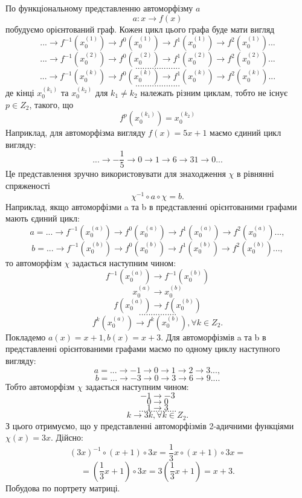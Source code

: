 \documentclass[a4paper,12pt]{article} \usepackage{a4wide}
\numberwithin{equation}{subsection}
\begin{document}
По функціональному представленню автоморфізму $a$ $$a:x\rightarrow f(x)$$
побудуємо орієнтований граф. Кожен цикл цього графа буде мати вигляд
$$...\rightarrow f^{-1}(x^{(1)}_0)\rightarrow f^0(x^{(1)}_0)\rightarrow f^1(x^{(1)}_0)\rightarrow f^2(x^{(1)}_0)...$$
$$...\rightarrow f^{-1}(x^{(2)}_0)\rightarrow f^0(x^{(2)}_0)\rightarrow f^1(x^{(2)}_0)\rightarrow f^2(x^{(2)}_0)...$$
$$...................$$
 $$...\rightarrow f^{-1}(x^{(k)}_0)\rightarrow f^0(x^{(k)}_0)\rightarrow f^1(x^{(k)}_0)\rightarrow f^2(x^{(k)}_0)...$$
 $$...................$$
  де кінці $x^{(k_1)}_0$ та $x^{(k_2)}_0$ для $k_1\neq k_2$ належать різним циклам,
   тобто не існує $p\in Z_2$, такого, що $$f^p(x^{(k_1)}_0)=x^{(k_2)}_0$$
   Наприклад, для автоморфізма вигляду $f(x)=5x+1$ маємо єдиний цикл вигляду:
   $$...\rightarrow -\frac{1}{5}\rightarrow 0\rightarrow 1\rightarrow 6\rightarrow 31\rightarrow 0...$$
Це представлення зручно використовувати для знаходження $\chi$ в рівнянні спряженості $$\chi^{-1}\circ a \circ \chi= b.$$
Наприклад, якщо автоморфізми a та b в  представленні орієнтованими графами мають єдиний цикл:
$$a=...\rightarrow f^{-1}(x^{(a)}_0)\rightarrow f^0(x^{(a)}_0)\rightarrow f^1(x^{(a)}_0)\rightarrow f^2(x^{(a)}_0)... ,$$
$$b=...\rightarrow f^{-1}(x^{(b)}_0)\rightarrow f^0(x^{(b)}_0)\rightarrow f^1(x^{(b)}_0)\rightarrow f^2(x^{(b)}_0)... ,$$
то автоморфізм $\chi$ задається наступним чином:
$$f^{-1}(x^{(a)}_0)\rightarrow f^{-1}(x^{(b)}_0)$$
$$x^{(a)}_0\rightarrow x^{(b)}_0$$
$$f(x^{(a)}_0)\rightarrow f(x^{(b)}_0)$$
$$................$$
$$f^{k}(x^{(a)}_0)\rightarrow f^{k}(x^{(b)}_0),\forall k \in Z_2. $$
Покладемо $a(x)=x+1,b(x)=x+3$.
Для автоморфізмів a та b в  представленні орієнтованими графами маємо по одному циклу наступного вигляду:
$$a=...\rightarrow -1 \rightarrow 0 \rightarrow 1 \rightarrow 2 \rightarrow 3 ... ,$$
$$b=...\rightarrow -3 \rightarrow 0 \rightarrow 3\rightarrow 6 \rightarrow 9 ... .$$
Тобто автоморфізм $\chi$ задається наступним чином:
$$-1 \rightarrow-3$$
$$0 \rightarrow 0$$
$$1 \rightarrow 3$$
$$................$$
$$k \rightarrow 3k, \forall k \in Z_2. $$
З цього отримуємо, що у представленні автоморфізмів 2-адичними функціями $\chi(x)=3x$. Дійсно:
 $$(3x)^{-1}\circ (x+1)\circ 3x= \frac{1}{3}x\circ (x+1)\circ 3x =$$$$=(\frac{1}{3}x+1)\circ 3x=3(\frac{1}{3}x+1)=x+3.$$
Побудова по портрету матриці.
\end{document}

